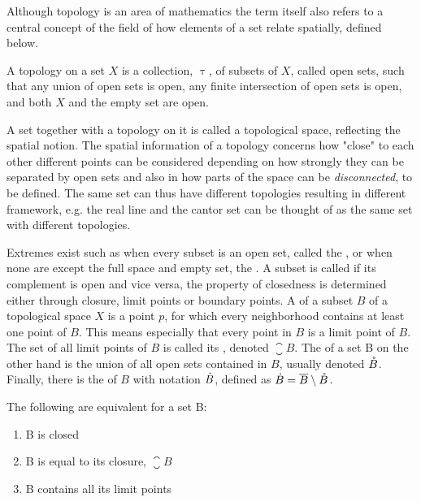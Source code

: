 \documentclass[../../main.tex]{subfiles}
\begin{document}
    Although topology is an area of mathematics the term itself also refers to a central concept of the field of how elements of a set relate spatially, defined below. 

    \begin{definition}
        A topology on a set $X$ is a collection, $\uptau$, of subsets of $X$, called open sets, such that any union of open sets is open, any finite intersection of open sets is open, and both $X$ and the empty set are open. 
    \end{definition}

    A set together with a topology on it is called a topological space, reflecting the spatial notion. The spatial information of a topology concerns how "close" to each other different points can be considered depending on how strongly they can be separated by open sets and also in how parts of the space can be \textit{disconnected}, to be defined. The same set can thus have different topologies resulting in different framework, e.g. the real line and the cantor set can be thought of as the same set with different topologies. 
            
    Extremes exist such as when every subset is an open set, called the , or when none are except the full space and empty set, the . A subset is called  if its complement is open and vice versa, the property of closedness is determined either through closure, limit points or boundary points. A  of a subset $B$ of a topological space $X$ is a point $p$, for which every neighborhood contains at least one point of $B$. This means especially that every point in $B$ is a limit point of $B$. The set of all limit points of $B$ is called its , denoted $\closure{B}$. The  of a set B on the other hand is the union of all open sets contained in $B$, usually denoted $\mathring{B}$. Finally, there is the  of $B$ with notation $\dot{B}$, defined as $\dot{B} = \overline{B} \setminus \mathring{B}$.
    
    \begin{proposition}
        The following are equivalent for a set B:
        \begin{enumerate}
            \item B is closed
            \item B is equal to its closure, $\closure{B}$
            \item B contains all its limit points
        \end{enumerate}
    \end{proposition}
\end{document}
